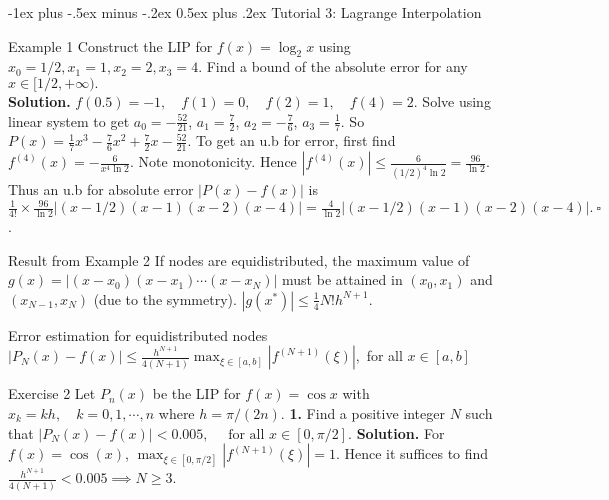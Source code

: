 \documentclass[10pt,landscape]{article}
\makeatletter
\renewcommand{\section}{\@startsection{section}{1}{0mm}%
                                {-1ex plus -.5ex minus -.2ex}%
                                {0.5ex plus .2ex}%
                                {\normalfont\large\bfseries}}
\theoremstyle{definition}
\newcommand{\thistheoremname}{}
\newtheorem*{genericthm*}{\thistheoremname}
\newenvironment{namedthm*}[1]
{\renewcommand{\thistheoremname}{#1}\begin{genericthm*}}
{\end{genericthm*}}
\makeatother
\begin{document}
\begin{multicols}{3}
	\section{Tutorial 3: Lagrange Interpolation}
	\begin{namedthm*}{Example 1} Construct the LIP for \(f(x)=\log _{2} x\) using \(x_{0}=1 / 2, x_{1}=1, x_{2}=2, x_{3}=4 .\) Find a bound of the absolute error for any
		\(x \in[1 / 2,+\infty) .\)
		\\\textbf{Solution.} \(f\left(0.5\right)=-1, \quad f\left(1\right)=0, \quad f\left(2\right)=1, \quad f\left(4\right)=2\). Solve using linear system
		to get \(a_0= -\frac{52}{21}\), \(a_1 = \frac{7}{2}\), \(a_2 =-\frac{7}{6}\), \(a_3=\frac{1}{7}\). So \(P(x)=\frac{1}{7} x^{3}-\frac{7}{6} x^{2}+\frac{7}{2} x-\frac{52}{21}\). To get an u.b for error, first find \(f^{(4)}(x)=-\frac{6}{x^{4} \ln 2}\). Note monotonicity. Hence \(\left|f^{(4)}(x)\right| \leqslant \frac{6}{(1 / 2)^{4} \ln 2}=\frac{96}{\ln 2}\). Thus an u.b for absolute error \(|P(x)-f(x)|\) is
		\(
		\frac{1}{4 !} \times \frac{96}{\ln 2}|(x-1 / 2)(x-1)(x-2)(x-4)|=\frac{4}{\ln 2}|(x-1 / 2)(x-1)(x-2)(x-4)|. \medspace \square
		\).
	\end{namedthm*}

	\begin{namedthm*}{Result from Example 2}
		If nodes are equidistributed, the maximum value of \(g(x)=\left|\left(x-x_{0}\right)\left(x-x_{1}\right) \cdots\left(x-x_{N}\right)\right|\) must be attained in \(\left(x_{0}, x_{1}\right)\) and \(\left(x_{N-1}, x_{N}\right)\) (due to the symmetry). \(\left|g\left(x^{*}\right)\right| \leqslant \frac{1}{4} N ! h^{N+1}\).
	\end{namedthm*}
	\begin{namedthm*}{Error estimation for equidistributed nodes}
		\(\left|P_{N}(x)-f(x)\right| \leqslant \frac{h^{N+1}}{4(N+1)} \max_{\xi \in[a, b]}\left|f^{(N+1)}(\xi)\right|,\) for all \(x \in[a, b]\)
	\end{namedthm*}

	\begin{namedthm*}{Exercise 2} Let \(P_{n}(x)\) be the LIP for \(f(x)=\cos x\) with \(x_{k}=k h, \quad k=0,1,\cdots, n\) where \(h=\pi /(2 n)\). \textbf{1.} Find a positive integer \(N\) such that
		\(
		\left|P_{N}(x)-f(x)\right|<0.005, \quad \text { for all } x \in[0, \pi / 2].
		\)
		\textbf{Solution.} For \(f(x)=\cos(x)\), \(\max _{\xi \in[0, \pi / 2]}\left|f^{(N+1)}(\xi)\right|=1\). Hence it suffices to find \(\frac{h^{N+1}}{4(N+1)} < 0.005 \implies N \geq 3\).
	\end{namedthm*}

\end{multicols}
\end{document}
